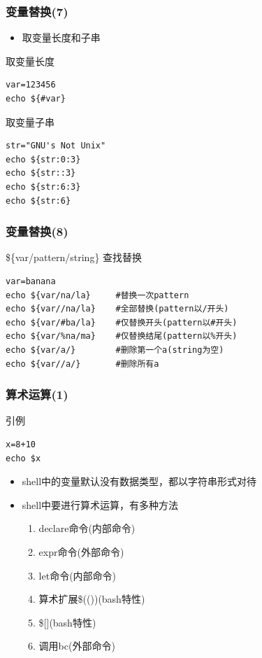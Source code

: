 \documentclass[xcolor=svgnames,presentation]{beamer}
\begin{document}
\begin{frame}[fragile]
\frametitle{变量替换(7)}
\label{sec-1-2-16}
\begin{itemize}

\item 取变量长度和子串
\label{sec-1-2-16-1}%
\end{itemize} %
\begin{exampleblock}{取变量长度}
\label{sec-1-2-16-2}


\begin{verbatim}
var=123456
echo ${#var}
\end{verbatim}
\end{exampleblock}
\begin{block}{取变量子串}
\label{sec-1-2-16-3}


\begin{verbatim}
str="GNU's Not Unix"
echo ${str:0:3}
echo ${str::3}
echo ${str:6:3}
echo ${str:6}
\end{verbatim}
\end{block}
\end{frame}
\begin{frame}[fragile]
\frametitle{变量替换(8)}
\label{sec-1-2-17}
\begin{block}{\$\{var/pattern/string\} 查找替换}
\label{sec-1-2-17-1}


\begin{verbatim}
var=banana
echo ${var/na/la}     #替换一次pattern
echo ${var//na/la}    #全部替换(pattern以/开头)
echo ${var/#ba/la}    #仅替换开头(pattern以#开头)
echo ${var/%na/ma}    #仅替换结尾(pattern以%开头)
echo ${var/a/}        #删除第一个a(string为空)
echo ${var//a/}       #删除所有a
\end{verbatim}
\end{block}
\end{frame}
\begin{frame}[fragile]
\frametitle{算术运算(1)}
\label{sec-1-2-18}
\begin{exampleblock}{引例}
\label{sec-1-2-18-1}


\begin{verbatim}
x=8+10
echo $x
\end{verbatim}
\end{exampleblock}
\begin{itemize}

\item shell中的变量默认没有数据类型，都以字符串形式对待
\label{sec-1-2-18-2}%

\item shell中要进行算术运算，有多种方法
\label{sec-1-2-18-3}%
\begin{enumerate}
\item declare命令(内部命令)
\item expr命令(外部命令)
\item let命令(内部命令)
\item 算术扩展\$(())(bash特性)
\item \$[](bash特性)
\item 调用bc(外部命令)
\end{enumerate}
\end{itemize} %
\end{frame}
\end{document}
